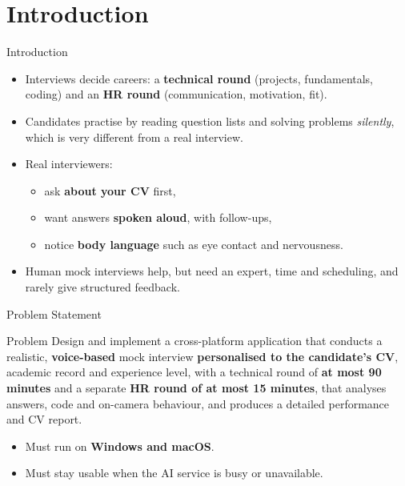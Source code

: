 \documentclass[aspectratio=169,11pt,xcolor=table]{beamer}
\begin{document}
\section{Introduction}
\begin{frame}{Introduction}
  \begin{itemize}
    \item Interviews decide careers: a \textbf{technical round} (projects, fundamentals, coding) and an \textbf{HR round} (communication, motivation, fit).
    \item Candidates practise by reading question lists and solving problems \emph{silently}, which is very different from a real interview.
    \item Real interviewers:
      \begin{itemize}
        \item ask \textbf{about your CV} first,
        \item want answers \textbf{spoken aloud}, with follow-ups,
        \item notice \textbf{body language} such as eye contact and nervousness.
      \end{itemize}
    \item Human mock interviews help, but need an expert, time and scheduling, and rarely give structured feedback.
  \end{itemize}
\end{frame}

\begin{frame}{Problem Statement}
  \begin{block}{Problem}
    Design and implement a cross-platform application that conducts a realistic, \textbf{voice-based} mock interview \textbf{personalised to the candidate's CV}, academic record and experience level, with a technical round of \textbf{at most 90 minutes} and a separate \textbf{HR round of at most 15 minutes}, that analyses answers, code and on-camera behaviour, and produces a detailed performance and CV report.
  \end{block}
  \vspace{0.3cm}
  \begin{itemize}
    \item Must run on \textbf{Windows and macOS}.
    \item Must stay usable when the AI service is busy or unavailable.
  \end{itemize}
\end{frame}
\end{document}
